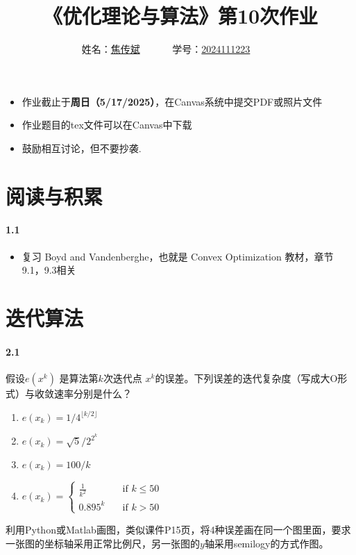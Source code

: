 \documentclass[12pt,a4paper]{article}
\begin{document}
\title{
{《优化理论与算法》第10次作业
}
}
\date{}

 \author{
 姓名：\underline{焦传斌}~~~~~~
 学号：\underline{2024111223}~~~~~~}

\maketitle
\begin{itemize}
	\item 作业截止于{\bf 周日（5/17/2025）}，在Canvas系统中提交PDF或照片文件
	\item 作业题目的tex文件可以在Canvas中下载
	\item 鼓励相互讨论，但不要抄袭.
\end{itemize}

\section{阅读与积累}
\paragraph{1.1}
\begin{itemize}
	\item 复习 Boyd and Vandenberghe，也就是 Convex Optimization 教材，章节9.1，9.3相关
\end{itemize}

\section{迭代算法}

\paragraph{2.1} 假设$e(x^k)$ 是算法第$k$次迭代点 $x^k$的误差。下列误差的迭代复杂度（写成大O形式）与收敛速率分别是什么？
\begin{enumerate}
	\item[(a)] $e(x_k)=1/4^{\lfloor k/2 \rfloor}$
	\item[(b)] $e(x_k)=\sqrt{5}/2^{2^{k}}$
	\item[(c)] $e(x_k)=100/k$
	\item[(d)] $e(x_k)=\begin{cases}
	\frac{1}{k^2} & \quad \text{if } k \leq 50  \\  0.895^k & \quad \text{if } k>50 
	\end{cases}$
\end{enumerate}
利用Python或Matlab画图，类似课件P15页，将4种误差画在同一个图里面，要求一张图的坐标轴采用正常比例尺，另一张图的$y$轴采用semilogy的方式作图。
\end{document}
